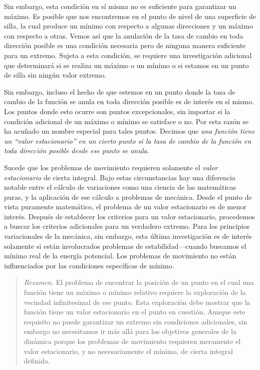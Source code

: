 \documentclass[12pt,a4paper]{book}
\begin{document}
Sin embargo, esta condición en sí misma no es suficiente para garantizar un máximo. Es posible que nos encontremos en el punto de nivel de una superficie de silla, la cual produce un mínimo con respecto a algunas direcciones y un máximo con respecto a otras. Vemos así que la anulación de la tasa de cambio en toda dirección posible es una condición necesaria pero de ninguna manera suficiente para un extremo. Sujeta a esta condición, se requiere una investigación adicional que determinará si se realiza un máximo o un mínimo o si estamos en un punto de silla sin ningún valor extremo.

Sin embargo, incluso el hecho de que estemos en un punto donde la tasa de cambio de la función se anula en toda dirección posible es de interés en sí mismo. Los puntos donde esto ocurre son puntos excepcionales, sin importar si la condición adicional de un máximo o mínimo se satisface o no. Por esta razón se ha acuñado un nombre especial para tales puntos. Decimos que \textit{una función tiene un ``valor estacionario'' en un cierto punto si la tasa de cambio de la función en toda dirección posible desde ese punto se anula}.

Sucede que los problemas de movimiento requieren solamente el \textit{valor estacionario} de cierta integral. Bajo estas circunstancias hay una diferencia notable entre el cálculo de variaciones como una ciencia de las matemáticas puras, y la aplicación de ese cálculo a problemas de mecánica. Desde el punto de vista puramente matemático, el problema de un valor estacionario es de menor interés. Después de establecer los criterios para un valor estacionario, procedemos a buscar los criterios adicionales para un verdadero extremo. Para los principios variacionales de la mecánica, sin embargo, esta última investigación es de interés solamente si están involucrados problemas de estabilidad---cuando buscamos el mínimo real de la energía potencial. Los problemas de movimiento no están influenciados por las condiciones específicas de mínimo.

\begin{quote}
\textit{Resumen.} El problema de encontrar la posición de un punto en el cual una función tiene un máximo o mínimo relativo requiere la exploración de la vecindad infinitesimal de ese punto. Esta exploración debe mostrar que la función tiene un valor estacionario en el punto en cuestión. Aunque este requisito no puede garantizar un extremo sin condiciones adicionales, sin embargo no necesitamos ir más allá para los objetivos generales de la dinámica porque los problemas de movimiento requieren meramente el valor estacionario, y no necesariamente el mínimo, de cierta integral definida.
\end{quote}
\end{document}
